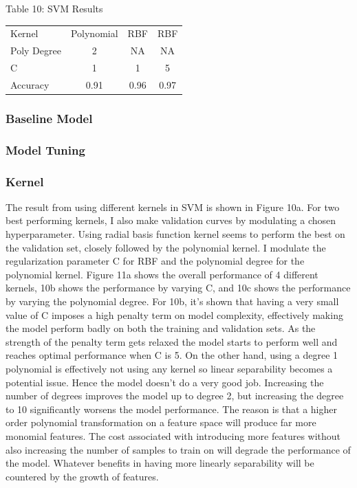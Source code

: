 \documentclass{article}
\begin{document}
\begin{table}
	
	\centering
	Table 10: SVM Results \\
	\begin{tabular}{ l c c c }
		\hline
		Kernel & Polynomial & RBF & RBF \\
		Poly Degree & 2 & NA & NA \\
		C & 1 & 1 & 5 \\
		\hline
		Accuracy & 0.91 & 0.96 & 0.97 \\
		\hline 
	\end{tabular}
\end{table}
\subsubsection*{Baseline Model}
\subsubsection*{Model Tuning}
\subsubsection*{Kernel}
The result from using different kernels in SVM is shown in Figure 10a. For two best performing kernels, I also make validation curves by modulating a chosen hyperparameter. Using radial basis function kernel seems to perform the best on the validation set, closely followed by the polynomial kernel. I modulate the regularization parameter C for RBF and the polynomial degree for the polynomial kernel. Figure 11a shows the overall performance of 4 different kernels, 10b shows the performance by varying C, and 10c shows the performance by varying the polynomial degree. For 10b, it's shown that having a very small value of C imposes a high penalty term on model complexity, effectively making the model perform badly on both the training and validation sets. As the strength of the penalty term gets relaxed the model starts to perform well and reaches optimal performance when C is 5. On the other hand, using a degree 1 polynomial is effectively not using any kernel so linear separability becomes a potential issue. Hence the model doesn't do a very good job. Increasing the number of degrees improves the model up to degree 2, but increasing the degree to 10 significantly worsens the model performance. The reason is that a higher order polynomial transformation on a feature space will produce far more monomial features. The cost associated with introducing more features without also increasing the number of samples to train on will degrade the performance of the model. Whatever benefits in having more linearly separability will be countered by the growth of features. 
\end{document}
